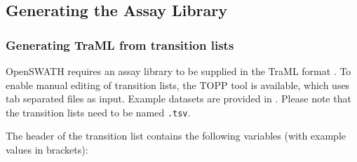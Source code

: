 \subsection{Generating the Assay Library}
\subsubsection{Generating TraML from transition lists}
OpenSWATH requires an assay library to be supplied in the TraML format \cite{Deutsch2012TraMLA}. To enable manual editing of transition lists, the TOPP tool  is available, which uses tab separated files as input. Example datasets are provided in . Please note that the transition lists need to be named \texttt{.tsv}.

\newline \noindent The header of the transition list contains the following variables (with example values in brackets):

